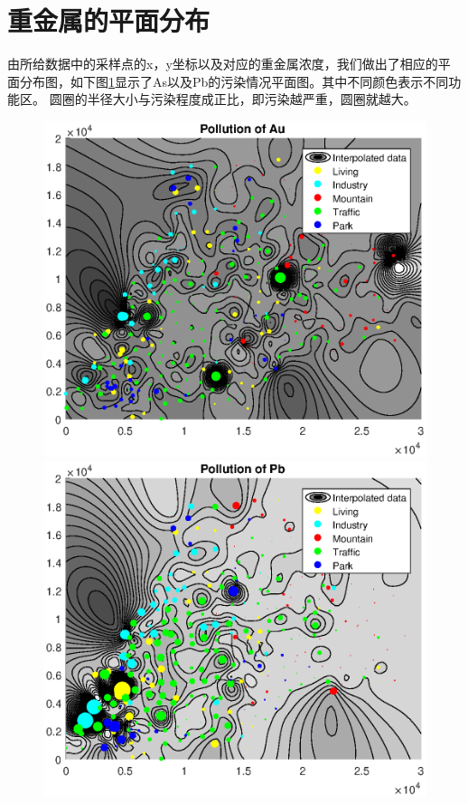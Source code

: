 \documentclass[a4paper]{article}
\begin{document}
\section{重金属的平面分布}
由所给数据中的采样点的x，y坐标以及对应的重金属浓度，我们做出了相应的平面分布图，如下图\ref{fig:char}显示了As以及Pb的污染情况平面图。其中不同颜色表示不同功能区。
圆圈的半径大小与污染程度成正比，即污染越严重，圆圈就越大。
\begin{figure}[h]
	\begin{minipage}[t]{0.5\linewidth}
    \centering
    \includegraphics[scale=0.5]{pictures/pollution-of-Au.eps}
    \end{minipage}
    \begin{minipage}[t]{0.5\linewidth}
    \centering 
	\includegraphics[scale=0.5]{pictures/pollution-of-Pb.eps}
    \end{minipage}
    \label{fig:char}
\end{figure}
\end{document}
